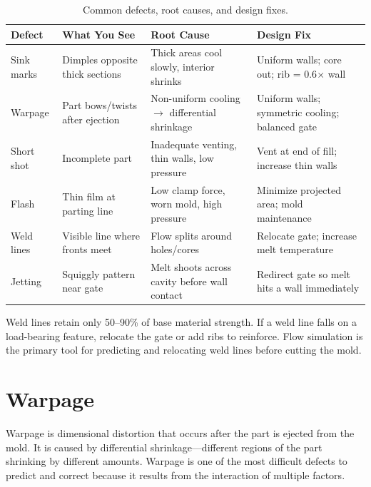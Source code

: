 \documentclass[11pt,letterpaper,twoside,openany]{book}
\begin{document}
\begin{table}[ht!]
\centering\small
\begin{tabularx}{\textwidth}{l l X X}
  \toprule
  \textbf{Defect} & \textbf{What You See} & \textbf{Root Cause} & \textbf{Design Fix} \\
  \midrule
  Sink marks & Dimples opposite thick sections & Thick areas cool slowly, interior shrinks & Uniform walls; core out; rib = 0.6$\times$ wall \\
  Warpage & Part bows/twists after ejection & Non-uniform cooling $\to$ differential shrinkage & Uniform walls; symmetric cooling; balanced gate \\
  Short shot & Incomplete part & Inadequate venting, thin walls, low pressure & Vent at end of fill; increase thin walls \\
  Flash & Thin film at parting line & Low clamp force, worn mold, high pressure & Minimize projected area; mold maintenance \\
  Weld lines & Visible line where fronts meet & Flow splits around holes/cores & Relocate gate; increase melt temperature \\
  Jetting & Squiggly pattern near gate & Melt shoots across cavity before wall contact & Redirect gate so melt hits a wall immediately \\
  \bottomrule
\end{tabularx}
\caption{Common defects, root causes, and design fixes.}
\end{table}

\begin{tipbox}
Weld lines retain only 50--90\% of base material strength. If a weld line falls on a load-bearing feature, relocate the gate or add ribs to reinforce. Flow simulation is the primary tool for predicting and relocating weld lines before cutting the mold.
\end{tipbox}


\FloatBarrier
\section{Warpage}
\label{sec:warp}

Warpage is dimensional distortion that occurs after the part is ejected from the mold. It is caused by differential shrinkage---different regions of the part shrinking by different amounts. Warpage is one of the most difficult defects to predict and correct because it results from the interaction of multiple factors.
\end{document}
